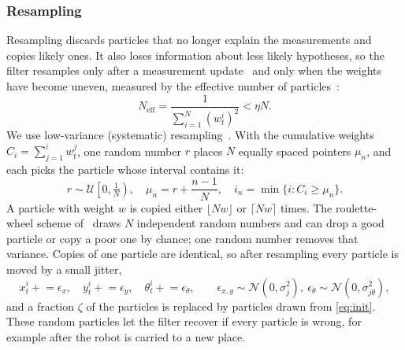 \documentclass[conference]{IEEEtran}
\begin{document}
\subsubsection{Resampling}
Resampling discards particles that no longer explain the measurements and copies likely ones. It also loses information about less likely hypotheses, so the filter resamples only after a measurement update~\cite{clark7b} and only when the weights have become uneven, measured by the effective number of particles~\cite{thrun2005}:
\begin{equation}
N_{\mathrm{eff}} = \frac{1}{\sum_{i=1}^{N} (w_t^i)^2} < \eta N.
\label{eq:neff}
\end{equation}
We use low-variance (systematic) resampling~\cite{kitagawa1996,thrun2005}. With the cumulative weights $C_i = \sum_{j=1}^{i} w_t^j$, one random number $r$ places $N$ equally spaced pointers $\mu_n$, and each picks the particle whose interval contains it:
\begin{equation}
r \sim \mathcal{U}\!\left[0, \tfrac{1}{N}\right), \quad \mu_n = r + \frac{n-1}{N}, \quad
i_n = \min \{ i : C_i \geq \mu_n \}.
\label{eq:lowvar}
\end{equation}
A particle with weight $w$ is copied either $\lfloor N w \rfloor$ or $\lceil N w \rceil$ times. The roulette-wheel scheme of~\cite{clark7b} draws $N$ independent random numbers and can drop a good particle or copy a poor one by chance; one random number removes that variance. Copies of one particle are identical, so after resampling every particle is moved by a small jitter,
\begin{equation}
x_t^i \mathrel{+}= \epsilon_x, \quad y_t^i \mathrel{+}= \epsilon_y, \quad \theta_t^i \mathrel{+}= \epsilon_\theta, \qquad
\epsilon_{x,y} \sim \mathcal{N}(0, \sigma_j^2), \ \epsilon_\theta \sim \mathcal{N}(0, \sigma_{j\theta}^2),
\label{eq:jitter}
\end{equation}
and a fraction $\zeta$ of the particles is replaced by particles drawn from \eqref{eq:init}. These random particles let the filter recover if every particle is wrong, for example after the robot is carried to a new place.
\end{document}
